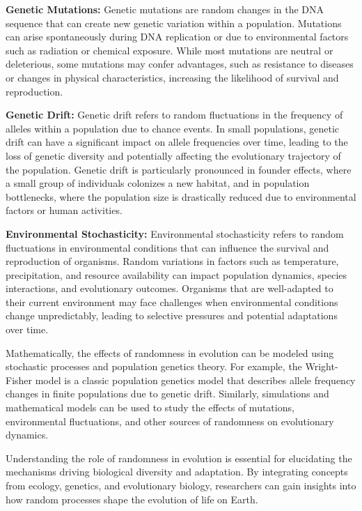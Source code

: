 \documentclass[12pt]{book} %
\begin{document}
\textbf{Genetic Mutations:} Genetic mutations are random changes in the DNA sequence that can create new genetic variation within a population. Mutations can arise spontaneously during DNA replication or due to environmental factors such as radiation or chemical exposure. While most mutations are neutral or deleterious, some mutations may confer advantages, such as resistance to diseases or changes in physical characteristics, increasing the likelihood of survival and reproduction.

\textbf{Genetic Drift:} Genetic drift refers to random fluctuations in the frequency of alleles within a population due to chance events. In small populations, genetic drift can have a significant impact on allele frequencies over time, leading to the loss of genetic diversity and potentially affecting the evolutionary trajectory of the population. Genetic drift is particularly pronounced in founder effects, where a small group of individuals colonizes a new habitat, and in population bottlenecks, where the population size is drastically reduced due to environmental factors or human activities.

\textbf{Environmental Stochasticity:} Environmental stochasticity refers to random fluctuations in environmental conditions that can influence the survival and reproduction of organisms. Random variations in factors such as temperature, precipitation, and resource availability can impact population dynamics, species interactions, and evolutionary outcomes. Organisms that are well-adapted to their current environment may face challenges when environmental conditions change unpredictably, leading to selective pressures and potential adaptations over time.

Mathematically, the effects of randomness in evolution can be modeled using stochastic processes and population genetics theory. For example, the Wright-Fisher model is a classic population genetics model that describes allele frequency changes in finite populations due to genetic drift. Similarly, simulations and mathematical models can be used to study the effects of mutations, environmental fluctuations, and other sources of randomness on evolutionary dynamics.

Understanding the role of randomness in evolution is essential for elucidating the mechanisms driving biological diversity and adaptation. By integrating concepts from ecology, genetics, and evolutionary biology, researchers can gain insights into how random processes shape the evolution of life on Earth.
\end{document}
